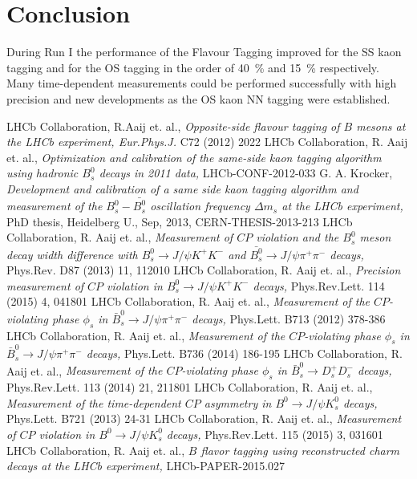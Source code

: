 \documentclass{PoS}
\begin{document}
\section{Conclusion}\label{sec:conclusion}

During Run I the performance of the Flavour Tagging improved for the SS kaon tagging and for the OS tagging in the order of \SI{40}{\%} and \SI{15}{\%} respectively. Many time-dependent measurements could be performed successfully with high precision and new developments as the OS kaon NN tagging were established. 

\begin{thebibliography}{99}
LHCb Collaboration, R.Aaij et. al., {\it Opposite-side flavour tagging of $B$ mesons at the LHCb experiment, Eur.Phys.J.} C72 (2012) 2022
LHCb Collaboration, R. Aaij et. al., {\it Optimization and calibration of the same-side kaon \mbox{tagging} algorithm using hadronic $B_s^0$ decays in 2011 data,} LHCb-CONF-2012-033
 G. A. Krocker, {\it Development and calibration of a same side kaon tagging algorithm and measurement of the $B_s^0-\bar{B_s^0}$ oscillation frequency $\Delta m_s$ at the LHCb experiment, } PhD thesis, Heidelberg U., Sep, 2013, CERN-THESIS-2013-213
LHCb Collaboration, R. Aaij et. al., {\it Measurement of $C\!P$ violation and the $B_s^0$ meson decay width difference with   $B_s^0\to J\!/\!\psi K^+K^-$ and \mbox{$\bar{B_s^0}\to J\!/\!\psi \pi^+\pi^-$} decays, } Phys.Rev. D87 (2013) 11, 112010
LHCb Collaboration, R. Aaij et. al., {\it Precision measurement of $C\!P$ violation in $B_s^0\to J\!/\!\psi K^+K^-$ decays, } Phys.Rev.Lett. 114 (2015) 4, 041801
 LHCb Collaboration, R. Aaij et. al., {\it Measurement of the $C\!P$-violating phase $\phi_s$ in $\bar{B}_s^0\to J\!/\!\psi \pi^+\pi^-$ decays, } Phys.Lett. B713 (2012) 378-386
 LHCb Collaboration, R. Aaij et. al., {\it Measurement of the $C\!P$-violating phase $\phi_s$ in $\bar{B}_s^0\to J\!/\!\psi \pi^+\pi^-$ decays, } Phys.Lett. B736 (2014) 186-195
 LHCb Collaboration, R. Aaij et. al., {\it Measurement of the $C\!P$-violating phase $\phi_s$ in $\bar{B}_s^0\to D_s^+D_s^-$ decays, } Phys.Rev.Lett. 113 (2014) 21, 211801
 LHCb Collaboration, R. Aaij et. al., {\it Measurement of the time-dependent $C\!P$ asymmetry in $B^0\to J\!/\!\psi K_s^0$ decays, } Phys.Lett. B721 (2013) 24-31
 LHCb Collaboration, R. Aaij et. al., {\it Measurement of $C\!P$ violation in \mbox{$B^0\to J\!/\!\psi K_s^0$} decays, } Phys.Rev.Lett. 115 (2015) 3, 031601
 LHCb Collaboration, R. Aaij et. al., {\it $B$ flavor tagging using reconstructed charm decays at the LHCb experiment, } LHCb-PAPER-2015.027

\end{thebibliography} 
\end{document}
